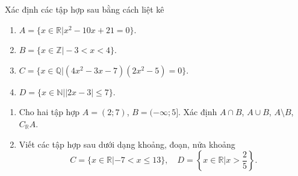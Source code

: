 \begin{bt}%
	Xác định các tập hợp sau bằng cách liệt kê
		\begin{enumerate}
			\item $A=\{x\in\mathbb{R}\big|x^2-10x+21=0\}$.
			\item $B=\{x\in\mathbb{Z}\big|-3<x<4\}$.
			\item $C=\{x\in\mathbb{Q}\big|(4x^2-3x-7)(2x^2-5)=0\}$.
			\item $D=\{x\in\mathbb{N}\big||2x-3|\leq7\}$.
		\end{enumerate}
\end{bt}
\begin{bt}%
	\begin{enumerate}
		\item Cho hai tập hợp $A=(2;7)$, $B=(-\infty;5]$. Xác định $A\cap B$, $A\cup B$, $A\setminus B$, $C_\mathbb{R} A$.
		\item Viết các tập hợp sau dưới dạng khoảng, đoạn, nửa khoảng
		\begin{equation*}
			C=\{x\in\mathbb{R}|-7<x\leq13\}, \quad D=\left\{x\in\mathbb{R}\Big|x>\dfrac{2}{5}\right\}.
		\end{equation*}
	\end{enumerate}
	\loigiai{
		\begin{enumerate}
			\item $A\cap B=(2;5]$, $A\cup B =(-\infty;7)$, $A\setminus B=(5;7)$, $C_\mathbb{R}A=(-\infty;2]\cup[7;+\infty)$.
			\item $C=(-7;13]$, $D=\left(\dfrac{2}{5};+\infty\right)$.
		\end{enumerate}
	}
\end{bt}
